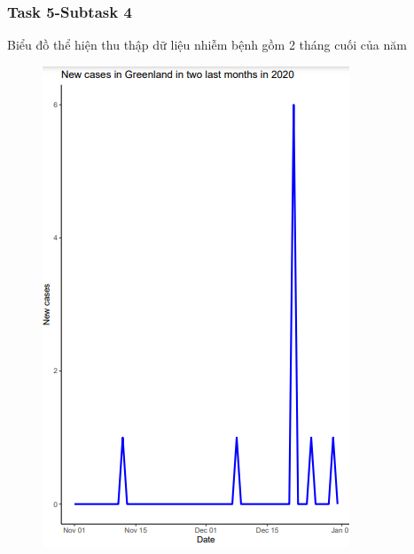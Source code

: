 \documentclass[english,10pt,table]{beamer}
\begin{document}
{
    \frametitle{Task 5-Subtask 4}
    \begin{block}{Biểu đồ thể hiện thu thập dữ liệu nhiễm bệnh gồm 2 tháng cuối của năm}
    \begin{figure}[H]
		\centering
		\includegraphics[scale=0.5]{images/5.4.2.png}
	\end{figure}
    \end{block}
}\frame
\end{document}
